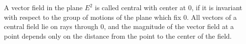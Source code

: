 A vector field in the plane $E^2$ is called central with center at $0$, if it is invariant with respect to the group of motions of the plane which fix $0$. All vectors of a central field lie on rays through $0$, and the magnitude of the vector field at a point depends only on the distance from the point to the center of the field.
